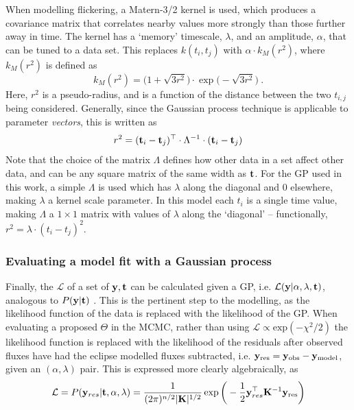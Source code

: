 When modelling flickering, a Matern-3/2 kernel is used, which produces a covariance matrix that correlates nearby values more strongly than those further away in time. The kernel has a `memory' timescale, $\lambda$, and an amplitude, $\alpha$, that can be tuned to a data set. This replaces $k(t_i, t_j)$ with $\alpha \cdot k_{M}(r^2)$, where $k_{M}(r^2)$ is defined as
\begin{equation}
    k_{M}(r^2) = \big(1+\sqrt{3r^2}\big) \cdot\exp\big(-\sqrt{3r^2}\big)\ .
\end{equation}
Here, $r^2$ is a pseudo-radius, and is a function of the distance between the two $t_{i,j}$ being considered. Generally, since the Gaussian process technique is applicable to parameter \textit{vectors}, this is written as
\begin{equation}
    r^2 = ({\bf t}_i - {\bf t}_j)^{\top} \cdot \Lambda^{-1} \cdot ({\bf t}_i - {\bf t}_j)
\end{equation}
Note that the choice of the matrix $\Lambda$ defines how other data in a set affect other data, and can be any square matrix of the same width as $\bf t$. For the GP used in this work, a simple $\Lambda$ is used which has $\lambda$ along the diagonal and 0 elsewhere, making $\lambda$ a kernel scale parameter.
In this model each $t_i$ is a single time value, making $\Lambda$ a $1\times 1$ matrix with values of $\lambda$ along the `diagonal' -- functionally, $r^2 = \lambda \cdot {(t_i - t_j)}^2$.

\subsubsection{Evaluating a model fit with a Gaussian process}
\label{sect:modelling:GP model evaluation}

Finally, the $\mathcal{L}$ of a set of ${\bf y}, {\bf t}$ can be calculated given a GP, i.e. $\mathcal{L}({\bf y} | \alpha, \lambda, {\bf t})$, analogous to $P({\bf y} | {\bf t})$ \citep{rasmussen2006}.
This is the pertinent step to the modelling, as the likelihood function of the data is replaced with the likelihood of the GP.
When evaluating a proposed $\Theta$ in the MCMC, rather than using $\mathcal{L} \propto \mathrm{exp}(-\chi^2/2)$ the likelihood function is replaced with the likelihood of the residuals after observed fluxes have had the eclipse modelled fluxes subtracted, i.e. ${\bf y}_{\rm res} = {\bf y}_{\rm obs} - {\bf y}_{\rm model}$, given an $(\alpha, \lambda)$ pair. This is expressed more clearly algebraically, as
\begin{equation}
    \mathcal{L} = P({\bf y}_{res} | {\bf t}, \alpha, \lambda) = \frac{1}{(2\pi)^{n/2} |{\bf K}|^{1/2}} \exp \bigg(- \frac{1}{2} {\bf y}_{res}^{\top} {\bf K}^{-1} {\bf y}_{\rm res} \bigg)
\end{equation}

